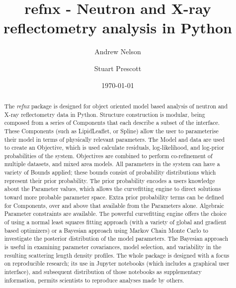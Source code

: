 \documentclass[12pt]{article}
\begin{document}
\title{refnx - Neutron and X-ray reflectometry analysis in Python}
\author[1,*]{Andrew Nelson}
\author[2]{Stuart Prescott}


\date{\today}

\newcommand{\refnx}{\emph{refnx }}
\newcommand{\Objective}{\textbf{Objective }}
\newcommand{\Parameter}{\textbf{Parameter }}
\newcommand{\Structure}{\textbf{Structure }}
\newcommand{\Slab}{\textbf{Slab }}
\newcommand{\Component}{\textbf{Component }}

\maketitle

\begin{abstract}
The \refnx package is designed for object oriented model based analysis of neutron and X-ray reflectometry data in Python. Structure construction is modular, being composed from a series of Components that each describe a subset of the interface. These Components (such as LipidLeaflet, or Spline) allow the user to parameterise their model in terms of physically relevant parameters. The Model and data are used to create an Objective, which is used calculate residuals, log-likelihood, and log-prior probabilities of the system. Objectives are combined to perform co-refinement of multiple datasets, and mixed area models. All parameters in the system can have a variety of Bounds applied; these bounds consist of probability distributions which represent their prior probability. The prior probability encodes a users knowledge about the Parameter values, which allows the curvefitting engine to direct solutions toward more probable parameter space. Extra prior probability terms can be defined for Components, over and above that available from the Parameters alone.
Algebraic Parameter constraints are available.
The powerful curvefitting engine offers the choice of using a normal least squares fitting approach (with a variety of global and gradient based optimizers) or a Bayesian approach using Markov Chain Monte Carlo to investigate the posterior distribution of the model parameters. The Bayesian approach is useful in examining parameter covariances, model selection, and variability in the resulting scattering length density profiles.
The whole package is designed with a focus on reproducible research; its use in Jupyter notebooks (which includes a graphical user interface), and subsequent distribution of those notebooks as supplementary information, permits scientists to reproduce analyses made by others.
\end{abstract}
\end{document}
